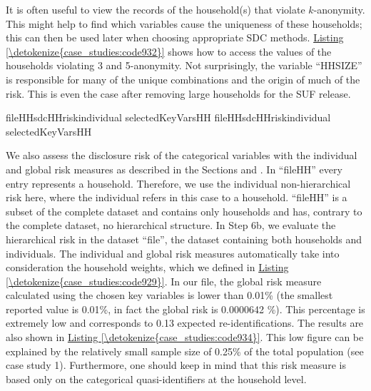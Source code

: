 \documentclass[letterpaper,10pt,english]{sphinxmanual}
\begin{document}
It is often useful to view the records of the household(s) that violate
\(k\)-anonymity. This might help to find which variables cause the
uniqueness of these households; this can then be used later when
choosing appropriate SDC methods. \hyperref[\detokenize{case_studies:code932}]{Listing \ref{\detokenize{case_studies:code932}}} shows how to access the
values of the households violating 3 and 5-anonymity. Not surprisingly,
the variable “HHSIZE” is responsible for many of the unique combinations
and the origin of much of the risk. This is even the case after removing
large households for the SUF release.

\def\sphinxLiteralBlockLabel{\label{\detokenize{case_studies:code933}}}
%
\begin{sphinxVerbatim}[commandchars=\\\{\},numbers=left,firstnumber=1,stepnumber=1]
fileHH\PYG{p}{[}sdcHHriskindividual\PYG{p}{[}\PYG{p}{]}   selectedKeyVarsHH\PYG{p}{]} 
fileHH\PYG{p}{[}sdcHHriskindividual\PYG{p}{[}\PYG{p}{]}   selectedKeyVarsHH\PYG{p}{]} 
\end{sphinxVerbatim}

We also assess the disclosure risk of the categorical variables with the
individual and global risk measures as described in the Sections
and .
In “fileHH” every entry represents a household. Therefore, we use
the individual non-hierarchical risk here, where the individual refers
in this case to a household. “fileHH” is a subset of the complete
dataset and contains only households and has, contrary to the complete
dataset, no hierarchical structure. In Step 6b, we evaluate the
hierarchical risk in the dataset “file”, the dataset containing both
households and individuals. The individual and global risk measures
automatically take into consideration the household weights, which we
defined in \hyperref[\detokenize{case_studies:code929}]{Listing \ref{\detokenize{case_studies:code929}}}. In our file, the global risk measure calculated
using the chosen key variables is lower than 0.01\% (the smallest
reported value is 0.01\%, in fact the global risk is 0.0000642 \%). This
percentage is extremely low and corresponds to 0.13 expected
re-identifications. The results are also shown in \hyperref[\detokenize{case_studies:code934}]{Listing \ref{\detokenize{case_studies:code934}}}. This low
figure can be explained by the relatively small sample size of 0.25\% of
the total population (see case study 1). Furthermore, one should keep in
mind that this risk measure is based only on the categorical
quasi-identifiers at the household level.
\end{document}
